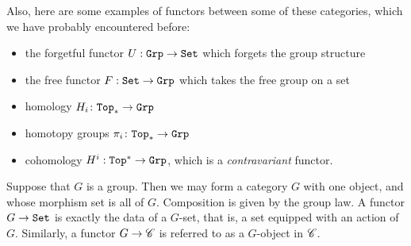 \documentclass{article}[11pt]
\begin{document}
Also, here are some examples of functors between some of these categories, which we have probably encountered before:
\begin{itemize}\itemsep0em 
	\item the {forgetful functor}  $U: \texttt{Grp} \to \texttt{Set}$ which forgets the group structure
	\item  the {free functor} $F:\texttt{Set} \to \texttt{Grp}$  which takes the free group on a set
	\item  homology $H_i \colon \texttt{Top}_\ast \to \texttt{Grp}$ 
	\item  homotopy groups $\pi_i \colon \texttt{Top}_\ast \to \texttt{Grp}$ 
	\item cohomology $H^i : \texttt{Top}^\ast \to \texttt{Grp}$, which is a \textit{contravariant} functor.
\end{itemize}



\begin{example} Suppose that $G$ is a group. Then we may form a category $G$ with one object, and whose morphism set is all of $G$. Composition is given by the group law. A functor $G \to \texttt{Set}$ is exactly the data of a $G$-set, that is, a set equipped with an action of $G$. Similarly, a functor $G \to \mathscr{C}$ is referred to as a $G$-object in $\mathscr{C}$.
\end{example}
\end{document}
